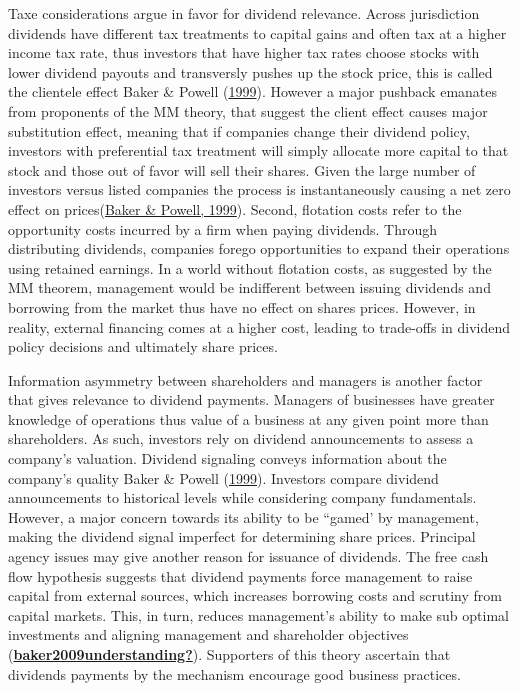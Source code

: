 \documentclass[11pt,preprint, authoryear]{elsarticle}
\numberwithin{equation}{section}
\numberwithin{figure}{section}
\numberwithin{table}{section}
\begin{document}
Taxe considerations argue in favor for dividend relevance. Across
jurisdiction dividends have different tax treatments to capital gains
and often tax at a higher income tax rate, thus investors that have
higher tax rates choose stocks with lower dividend payouts and
transversly pushes up the stock price, this is called the clientele
effect Baker \& Powell
(\protect\hyperlink{ref-baker1999corporate}{1999}). However a major
pushback emanates from proponents of the MM theory, that suggest the
client effect causes major substitution effect, meaning that if
companies change their dividend policy, investors with preferential tax
treatment will simply allocate more capital to that stock and those out
of favor will sell their shares. Given the large number of investors
versus listed companies the process is instantaneously causing a net
zero effect on prices(\protect\hyperlink{ref-baker1999corporate}{Baker
\& Powell, 1999}). Second, flotation costs refer to the opportunity
costs incurred by a firm when paying dividends. Through distributing
dividends, companies forego opportunities to expand their operations
using retained earnings. In a world without flotation costs, as
suggested by the MM theorem, management would be indifferent between
issuing dividends and borrowing from the market thus have no effect on
shares prices. However, in reality, external financing comes at a higher
cost, leading to trade-offs in dividend policy decisions and ultimately
share prices.

Information asymmetry between shareholders and managers is another
factor that gives relevance to dividend payments. Managers of businesses
have greater knowledge of operations thus value of a business at any
given point more than shareholders. As such, investors rely on dividend
announcements to assess a company's valuation. Dividend signaling
conveys information about the company's quality Baker \& Powell
(\protect\hyperlink{ref-baker1999corporate}{1999}). Investors compare
dividend announcements to historical levels while considering company
fundamentals. However, a major concern towards its ability to be
``gamed' by management, making the dividend signal imperfect for
determining share prices. Principal agency issues may give another
reason for issuance of dividends. The free cash flow hypothesis suggests
that dividend payments force management to raise capital from external
sources, which increases borrowing costs and scrutiny from capital
markets. This, in turn, reduces management's ability to make sub optimal
investments and aligning management and shareholder objectives
(\protect\hyperlink{ref-baker2009understanding}{\textbf{baker2009understanding?}}).
Supporters of this theory ascertain that dividends payments by the
mechanism encourage good business practices.
\end{document}

